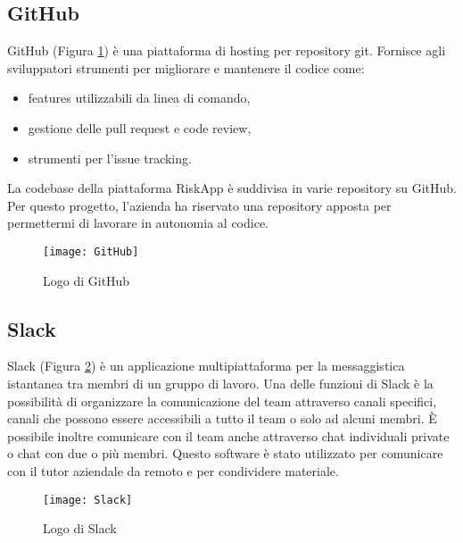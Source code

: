 \subsection{GitHub}
GitHub (Figura \ref{fig:github}) è una piattaforma di hosting per repository git.\newline
Fornisce agli sviluppatori strumenti per migliorare e mantenere il codice come:
\begin{itemize}
    \item features utilizzabili da linea di comando,
    \item gestione delle pull request e code review,
    \item strumenti per l’issue tracking.
\end{itemize}
La codebase della piattaforma RiskApp è suddivisa in varie repository su GitHub.\newline
Per questo progetto, l'azienda ha riservato una repository apposta per permettermi di lavorare in autonomia al codice.\newline
\begin{figure}[!h] 
    \centering 
    \texttt{[image: GitHub]} 
    \caption{Logo di GitHub}\label{fig:github}
\end{figure}

\subsection{Slack}
Slack (Figura \ref{fig:slack}) è un applicazione multipiattaforma per la messaggistica istantanea tra membri di un gruppo di lavoro.\newline
Una delle funzioni di Slack è la possibilità di organizzare la comunicazione del team attraverso canali specifici, canali che possono essere accessibili a tutto il team o solo ad alcuni membri.\newline
È possibile inoltre comunicare con il team anche attraverso chat individuali private o chat con due o più membri.\newline
Questo software è stato utilizzato per comunicare con il tutor aziendale da remoto e per condividere materiale.\newline
\begin{figure}[!h] 
    \centering 
    \texttt{[image: Slack]} 
    \caption{Logo di Slack}\label{fig:slack}
\end{figure}

